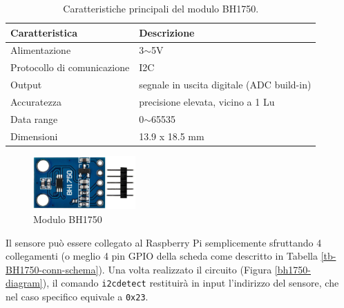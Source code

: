 \begin{table}[H]
    \centering
    \begin{tabular}{|l|l|}
    \hline
    \textbf{Caratteristica}     & \textbf{Descrizione}                      \\ \hline    Alimentazione               & 3$\sim$5V                                 \\ \hline
    Protocollo di comunicazione & I2C                                       \\ \hline
    Output                      & segnale in uscita digitale (ADC build-in) \\ \hline
    Accuratezza                 & precisione elevata, vicino a 1 Lu         \\ \hline
    Data range                  & 0$\sim$65535                              \\ \hline
    Dimensioni                  & 13.9 x 18.5 mm                           \\ \hline
    \end{tabular}
    \caption{\label{bh1750-features}Caratteristiche principali del modulo BH1750.}
\end{table}
%
\begin{figure}[H]
    \begin{center}
      \includegraphics[width=0.35\textwidth]{images/sensors/bh1750.png}
    \end{center}
    \caption{Modulo BH1750}
\end{figure}
%
Il sensore può essere collegato al Raspberry Pi semplicemente sfruttando 4 collegamenti (o meglio 4 pin GPIO della scheda come descritto in Tabella \ref*{tb-BH1750-conn-schema}). Una volta realizzato il circuito (Figura \ref*{bh1750-diagram}), il comando \texttt{i2cdetect} restituirà in input l'indirizzo del sensore, che nel caso specifico equivale a \texttt{0x23}.
%
